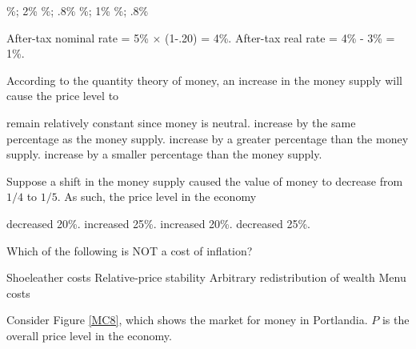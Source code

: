 \documentclass[addpoints,11pt]{exam}
\theoremstyle{definition}
\begin{document}
\begin{questions}
	\begin{choices}
		\%; 2\%
		\%; .8\%
		\%; 1\%
		\%; .8\%
	\end{choices}
	
	\begin{solution}
		After-tax nominal rate = 5\% $\times$ (1-.20) = 4\%. After-tax real rate = 4\% - 3\% = 1\%.
	\end{solution}
	
	\question According to the quantity theory of money, an increase in the money supply will cause the price level to 
	
	\begin{choices}
		\choice remain relatively constant since money is neutral.
		\CorrectChoice increase by the same percentage as the money supply.
		\choice increase by a greater percentage than the money supply.
		\choice increase by a smaller percentage than the money supply.
	\end{choices}
	
	\question Suppose a shift in the money supply caused the value of money to decrease from $1/4$ to $1/5$. As such, the price level in the economy
	
	\begin{choices}
		\choice decreased 20\%.
		\CorrectChoice increased 25\%.
		\choice increased 20\%.
		\choice decreased 25\%.
	\end{choices}
	
	
	\question Which of the following is NOT a cost of inflation?
	
	\begin{choices}
		\choice Shoeleather costs
		\CorrectChoice Relative-price stability
		\choice Arbitrary redistribution of wealth
		\choice Menu costs
	\end{choices}

\newpage
	
	\question Consider Figure \ref{MC8}, which shows the market for money in Portlandia. $P$ is the overall price level in the economy.
	

\end{questions}
\end{document}
